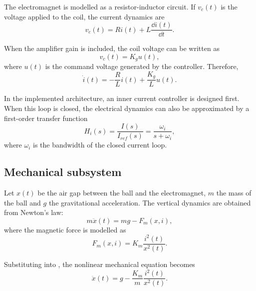 The electromagnet is modelled as a resistor-inductor circuit. If $v_c(t)$ is the voltage applied to the coil, the current dynamics are
\begin{equation}
    v_c(t) = R i(t) + L \frac{\dd i(t)}{\dd t}.
    \label{eq:electrical_rl}
\end{equation}

When the amplifier gain is included, the coil voltage can be written as
\begin{equation}
    v_c(t) = K_g u(t),
\end{equation}
where $u(t)$ is the command voltage generated by the controller. Therefore,
\begin{equation}
    \dot{i}(t) = -\frac{R}{L}i(t) + \frac{K_g}{L}u(t).
    \label{eq:current_dynamics}
\end{equation}

In the implemented architecture, an inner current controller is designed first. When this loop is closed, the electrical dynamics can also be approximated by a first-order transfer function
\begin{equation}
    H_i(s) = \frac{I(s)}{I_{ref}(s)} = \frac{\omega_i}{s + \omega_i},
    \label{eq:current_closed_loop}
\end{equation}
where $\omega_i$ is the bandwidth of the closed current loop.

\subsection{Mechanical subsystem}

Let $x(t)$ be the air gap between the ball and the electromagnet, $m$ the mass of the ball and $g$ the gravitational acceleration. The vertical dynamics are obtained from Newton's law:
\begin{equation}
    m\ddot{x}(t) = mg - F_m(x,i),
    \label{eq:newton}
\end{equation}
where the magnetic force is modelled as
\begin{equation}
    F_m(x,i) = K_m \frac{i^2(t)}{x^2(t)}.
    \label{eq:magnetic_force}
\end{equation}

Substituting  into , the nonlinear mechanical equation becomes
\begin{equation}
    \ddot{x}(t) = g - \frac{K_m}{m}\frac{i^2(t)}{x^2(t)}.
    \label{eq:mechanical_nonlinear}
\end{equation}

